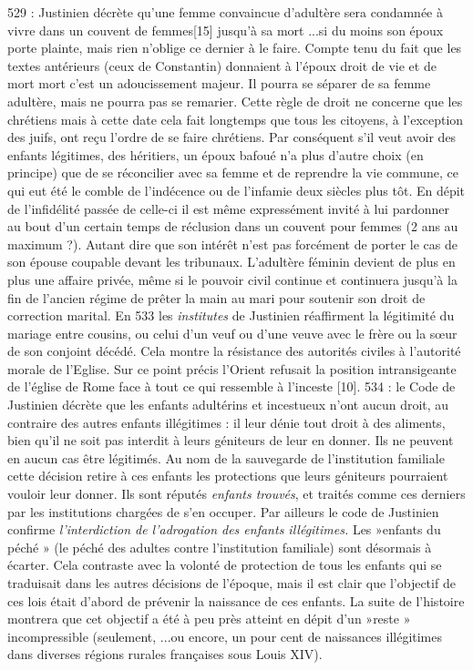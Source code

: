  529 : Justinien décrète qu'une femme convaincue d'adultère sera condamnée à vivre dans un couvent de femmes[15] jusqu'à sa mort ...si du moins son époux porte plainte, mais rien n'oblige ce dernier à le faire. Compte tenu du fait que les textes antérieurs (ceux de Constantin) donnaient à l'époux droit de vie et de mort mort c'est un adoucissement majeur. Il pourra se séparer de sa femme adultère, mais ne pourra pas se remarier. Cette règle de droit ne concerne que les chrétiens mais à cette date cela fait longtemps que tous les citoyens, à l'exception des juifs, ont reçu l'ordre de se faire chrétiens. Par conséquent s'il veut avoir des enfants légitimes, des héritiers, un époux bafoué n'a plus d'autre choix (en principe) que de se réconcilier avec sa femme et de reprendre la vie commune, ce qui eut été le comble de l'indécence ou de l'infamie deux siècles plus tôt. En dépit de l'infidélité passée de celle-ci il est même expressément invité à lui pardonner au bout d'un certain temps de réclusion dans un couvent pour femmes (2 ans au maximum ?). Autant dire que son intérêt n'est pas forcément de porter le cas de son épouse coupable devant les tribunaux. L'adultère féminin devient de plus en plus une affaire privée, même si le pouvoir civil continue et continuera jusqu'à la fin de l'ancien régime de prêter la main au mari pour soutenir son droit de correction marital. 
 En 533 les \emph{institutes} de Justinien réaffirment la légitimité du mariage entre cousins, ou celui d'un veuf ou d'une veuve avec le frère ou la sœur de son conjoint décédé. Cela montre la résistance des autorités civiles à l'autorité morale de l'Eglise. Sur ce point précis l'Orient refusait la position intransigeante de l'église de Rome face à tout ce qui ressemble à l'inceste [10].
 534 : le Code de Justinien décrète que les enfants adultérins et incestueux n'ont aucun droit, au contraire des autres enfants illégitimes : il leur dénie tout droit à des aliments, bien qu'il ne soit pas interdit à leurs géniteurs de leur en donner. Ils ne peuvent en aucun cas être légitimés. Au nom de la sauvegarde de l'institution familiale cette décision retire à ces enfants les protections que leurs géniteurs pourraient vouloir leur donner. Ils sont réputés \emph{enfants trouvés}, et traités comme ces derniers par les institutions chargées de s'en occuper. 
 Par ailleurs le code de Justinien confirme \emph{l'interdiction de l'adrogation des enfants illégitimes.} Les »enfants du péché » (le péché des adultes contre l'institution familiale) sont désormais à écarter. Cela contraste avec la volonté de protection de tous les enfants qui se traduisait dans les autres décisions de l'époque, mais il est clair que l'objectif de ces lois était d'abord de prévenir la naissance de ces enfants. La suite de l'histoire montrera que cet objectif a été à peu près atteint en dépit d'un »reste » incompressible (seulement, ...ou encore, un pour cent de naissances illégitimes dans diverses régions rurales françaises sous Louis XIV). 
